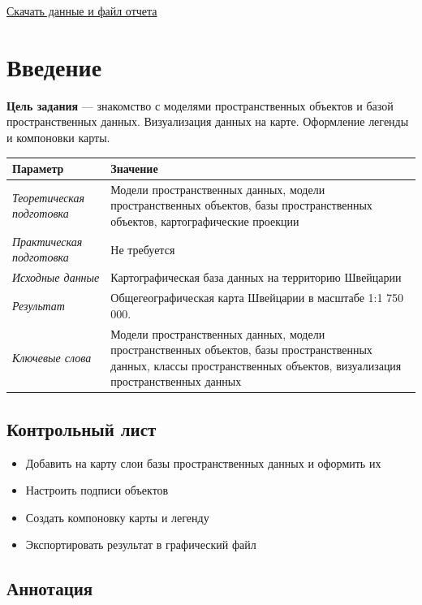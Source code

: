 \documentclass[]{book}
\providecommand{\tightlist}{%
  \setlength{\itemsep}{0pt}\setlength{\parskip}{0pt}}
\theoremstyle{definition}
\theoremstyle{definition}
\theoremstyle{definition}
\theoremstyle{remark}
\begin{document}
\href{http://autolab.geogr.msu.ru/gis/data/Ex02.zip}{Скачать данные и
файл отчета}

\hypertarget{map-design-general-intro}{%
\section{Введение}\label{map-design-general-intro}}

\textbf{Цель задания} --- знакомство с моделями пространственных
объектов и базой пространственных данных. Визуализация данных на карте.
Оформление легенды и компоновки карты.

\begin{longtable}[]{@{}ll@{}}
\toprule
Параметр & Значение\tabularnewline
\midrule
\endhead
\emph{Теоретическая подготовка} & Модели пространственных данных, модели
пространственных объектов, базы пространственных объектов,
картографические проекции\tabularnewline
\emph{Практическая подготовка} & Не требуется\tabularnewline
\emph{Исходные данные} & Картографическая база данных на территорию
Швейцарии\tabularnewline
\emph{Результат} & Общегеографическая карта Швейцарии в масштабе 1:1 750
000.\tabularnewline
\emph{Ключевые слова} & Модели пространственных данных, модели
пространственных объектов, базы пространственных данных, классы
пространственных объектов, визуализация пространственных
данных\tabularnewline
\bottomrule
\end{longtable}

\hypertarget{map-design-general-control}{%
\subsection{Контрольный лист}\label{map-design-general-control}}

\begin{itemize}
\tightlist
\item
  Добавить на карту слои базы пространственных данных и оформить их
\item
  Настроить подписи объектов
\item
  Создать компоновку карты и легенду
\item
  Экспортировать результат в графический файл
\end{itemize}

\hypertarget{map-design-general-annotation}{%
\subsection{Аннотация}\label{map-design-general-annotation}}
\end{document}
